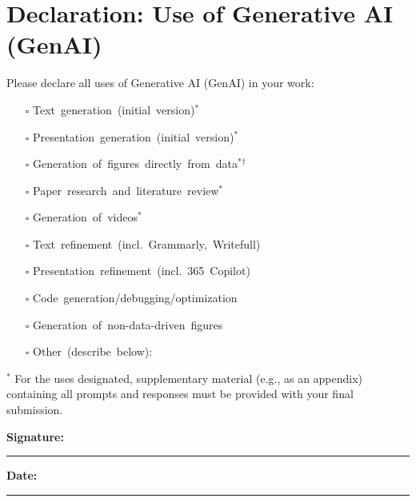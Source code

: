 \section*{Declaration: Use of Generative AI (GenAI)}

\vspace{1em}

Please declare all uses of Generative AI (GenAI) in your work:

{\scriptsize
\begin{multicols}{2}
\begin{itemize}[label={}, itemsep=0pt, parsep=0pt]
    \item[$\square$] \mbox{Text generation (initial version)${}^\ast$}
    \item[$\square$] \mbox{Presentation generation (initial version)${}^\ast$}
    \item[$\square$] \mbox{Generation of figures directly from data${}^\ast{}^\dagger$}
    \item[$\square$] \mbox{Paper research and literature review${}^\ast$}
    \item[$\square$] \mbox{Generation of videos${}^\ast$}
    \item[$\square$] \mbox{Text refinement (incl. Grammarly, Writefull)}
    \item[$\square$] \mbox{Presentation refinement (incl. 365 Copilot)}
    \item[$\square$] \mbox{Code generation/debugging/optimization}
    \item[$\square$] \mbox{Generation of non-data-driven figures}
    \item[$\square$] \mbox{Other (describe below):}
\end{itemize}
\end{multicols}
}
\vspace{-1em}
\fbox{
    \parbox[t][2cm][t]{\textwidth}{
        \vspace{0.5em}
        \hspace{0.5em} %
    }
}

{\footnotesize
${}^\ast$ For the uses designated, supplementary material (e.g., as an appendix) containing all prompts and responses must be provided with your final submission.
}

\vspace{2em}

\noindent
\textbf{Signature:} \rule{5cm}{0.4pt} \hfill \textbf{Date:} \rule{3cm}{0.4pt}

